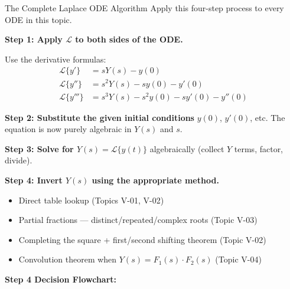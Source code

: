 \documentclass[12pt,a4paper]{article}
\begin{document}
\begin{infobox}{The Complete Laplace ODE Algorithm}
Apply this four-step process to every ODE in this topic.

\bigskip
\textbf{Step 1: Apply $\mathcal{L}$ to both sides of the ODE.}

Use the derivative formulas:
\begin{align}
\mathcal{L}\{y'\}   &= sY(s) - y(0) \nonumber \\
\mathcal{L}\{y''\}  &= s^2Y(s) - sy(0) - y'(0) \nonumber \\
\mathcal{L}\{y'''\} &= s^3Y(s) - s^2y(0) - sy'(0) - y''(0) \nonumber
\end{align}

\textbf{Step 2: Substitute the given initial conditions} $y(0)$, $y'(0)$, etc.
The equation is now purely algebraic in $Y(s)$ and $s$.

\textbf{Step 3: Solve for $Y(s) = \mathcal{L}\{y(t)\}$} algebraically (collect $Y$
terms, factor, divide).

\textbf{Step 4: Invert $Y(s)$ using the appropriate method.}
\begin{itemize}[nosep]
  \item Direct table lookup (Topics V-01, V-02)
  \item Partial fractions --- distinct/repeated/complex roots (Topic V-03)
  \item Completing the square + first/second shifting theorem (Topic V-02)
  \item Convolution theorem when $Y(s) = F_1(s)\cdot F_2(s)$ (Topic V-04)
\end{itemize}
\end{infobox}

\medskip
\textbf{Step 4 Decision Flowchart:}
\end{document}
